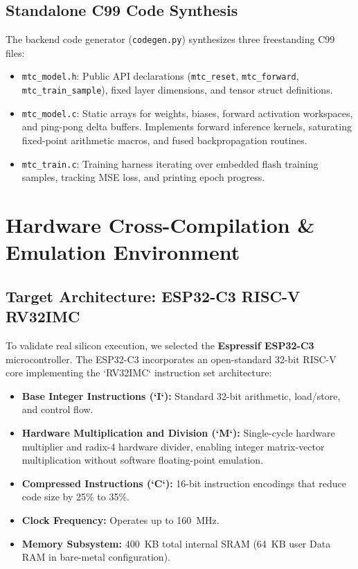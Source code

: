 \documentclass[12pt,a4paper]{report}
\begin{document}
\section{Standalone C99 Code Synthesis}
The backend code generator (\texttt{codegen.py}) synthesizes three freestanding C99 files:
\begin{itemize}
    \item \texttt{mtc\_model.h}: Public API declarations (\texttt{mtc\_reset}, \texttt{mtc\_forward}, \texttt{mtc\_train\_sample}), fixed layer dimensions, and tensor struct definitions.
    \item \texttt{mtc\_model.c}: Static arrays for weights, biases, forward activation workspaces, and ping-pong delta buffers. Implements forward inference kernels, saturating fixed-point arithmetic macros, and fused backpropagation routines.
    \item \texttt{mtc\_train.c}: Training harness iterating over embedded flash training samples, tracking MSE loss, and printing epoch progress.
\end{itemize}

\chapter{Hardware Cross-Compilation \& Emulation Environment}

\section{Target Architecture: ESP32-C3 RISC-V RV32IMC}
To validate real silicon execution, we selected the \textbf{Espressif ESP32-C3} microcontroller. The ESP32-C3 incorporates an open-standard 32-bit RISC-V core implementing the `RV32IMC` instruction set architecture:
\begin{itemize}
    \item \textbf{Base Integer Instructions (`I`):} Standard 32-bit arithmetic, load/store, and control flow.
    \item \textbf{Hardware Multiplication and Division (`M`):} Single-cycle hardware multiplier and radix-4 hardware divider, enabling integer matrix-vector multiplication without software floating-point emulation.
    \item \textbf{Compressed Instructions (`C`):} 16-bit instruction encodings that reduce code size by 25\% to 35\%.
    \item \textbf{Clock Frequency:} Operates up to 160~MHz.
    \item \textbf{Memory Subsystem:} 400~KB total internal SRAM (64~KB user Data RAM in bare-metal configuration).
\end{itemize}
\end{document}

